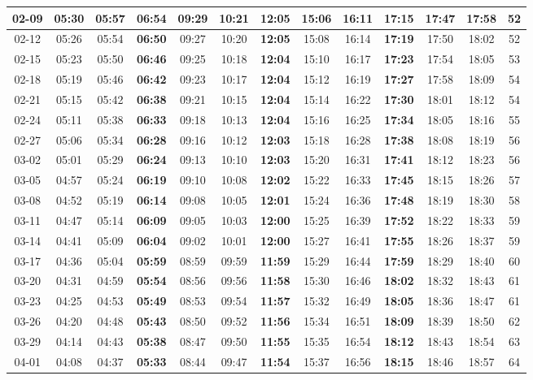 \begin{footnotesize}
\begin{longtable}{c | c | c | c | c | c | c | c | c | c | c | c | c}
		02-09&05:30&05:57&\textbf{06:54}&09:29&10:21&\textbf{12:05}&15:06&16:11&\textbf{17:15}&17:47&17:58&52\\\hline
		02-12&05:26&05:54&\textbf{06:50}&09:27&10:20&\textbf{12:05}&15:08&16:14&\textbf{17:19}&17:50&18:02&52\\\hline
		02-15&05:23&05:50&\textbf{06:46}&09:25&10:18&\textbf{12:04}&15:10&16:17&\textbf{17:23}&17:54&18:05&53\\\hline
		02-18&05:19&05:46&\textbf{06:42}&09:23&10:17&\textbf{12:04}&15:12&16:19&\textbf{17:27}&17:58&18:09&54\\\hline
		02-21&05:15&05:42&\textbf{06:38}&09:21&10:15&\textbf{12:04}&15:14&16:22&\textbf{17:30}&18:01&18:12&54\\\hline
		02-24&05:11&05:38&\textbf{06:33}&09:18&10:13&\textbf{12:04}&15:16&16:25&\textbf{17:34}&18:05&18:16&55\\\hline
		02-27&05:06&05:34&\textbf{06:28}&09:16&10:12&\textbf{12:03}&15:18&16:28&\textbf{17:38}&18:08&18:19&56\\\hline
		03-02&05:01&05:29&\textbf{06:24}&09:13&10:10&\textbf{12:03}&15:20&16:31&\textbf{17:41}&18:12&18:23&56\\\hline
		03-05&04:57&05:24&\textbf{06:19}&09:10&10:08&\textbf{12:02}&15:22&16:33&\textbf{17:45}&18:15&18:26&57\\\hline
		03-08&04:52&05:19&\textbf{06:14}&09:08&10:05&\textbf{12:01}&15:24&16:36&\textbf{17:48}&18:19&18:30&58\\\hline
		03-11&04:47&05:14&\textbf{06:09}&09:05&10:03&\textbf{12:00}&15:25&16:39&\textbf{17:52}&18:22&18:33&59\\\hline
		03-14&04:41&05:09&\textbf{06:04}&09:02&10:01&\textbf{12:00}&15:27&16:41&\textbf{17:55}&18:26&18:37&59\\\hline
		03-17&04:36&05:04&\textbf{05:59}&08:59&09:59&\textbf{11:59}&15:29&16:44&\textbf{17:59}&18:29&18:40&60\\\hline
		03-20&04:31&04:59&\textbf{05:54}&08:56&09:56&\textbf{11:58}&15:30&16:46&\textbf{18:02}&18:32&18:43&61\\\hline
		03-23&04:25&04:53&\textbf{05:49}&08:53&09:54&\textbf{11:57}&15:32&16:49&\textbf{18:05}&18:36&18:47&61\\\hline
		03-26&04:20&04:48&\textbf{05:43}&08:50&09:52&\textbf{11:56}&15:34&16:51&\textbf{18:09}&18:39&18:50&62\\\hline
		03-29&04:14&04:43&\textbf{05:38}&08:47&09:50&\textbf{11:55}&15:35&16:54&\textbf{18:12}&18:43&18:54&63\\\hline
		04-01&04:08&04:37&\textbf{05:33}&08:44&09:47&\textbf{11:54}&15:37&16:56&\textbf{18:15}&18:46&18:57&64\\\hline

\end{longtable}
\end{footnotesize}
